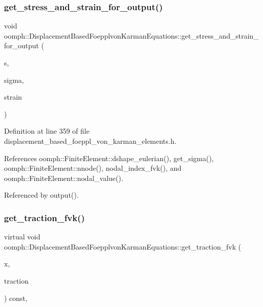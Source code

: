 \subsubsection{\texorpdfstring{get\+\_\+stress\+\_\+and\+\_\+strain\+\_\+for\+\_\+output()}{get\_stress\_and\_strain\_for\_output()}}
{\footnotesize\ttfamily void oomph\+::\+Displacement\+Based\+Foepplvon\+Karman\+Equations\+::get\+\_\+stress\+\_\+and\+\_\+strain\+\_\+for\+\_\+output (\begin{DoxyParamCaption}\item[{const \hyperlink{classoomph_1_1Vector}{Vector}$<$ double $>$ \&}]{s,  }\item[{\hyperlink{classoomph_1_1DenseMatrix}{Dense\+Matrix}$<$ double $>$ \&}]{sigma,  }\item[{\hyperlink{classoomph_1_1DenseMatrix}{Dense\+Matrix}$<$ double $>$ \&}]{strain }\end{DoxyParamCaption})\hspace{0.3cm}{\ttfamily [inline]}}



Definition at line 359 of file displacement\+\_\+based\+\_\+foeppl\+\_\+von\+\_\+karman\+\_\+elements.\+h.



References oomph\+::\+Finite\+Element\+::dshape\+\_\+eulerian(), get\+\_\+sigma(), oomph\+::\+Finite\+Element\+::nnode(), nodal\+\_\+index\+\_\+fvk(), and oomph\+::\+Finite\+Element\+::nodal\+\_\+value().



Referenced by output().

\mbox{\label{classoomph_1_1DisplacementBasedFoepplvonKarmanEquations_afd044e54b959f0238ec8724ea529fbd6}} 
\subsubsection{\texorpdfstring{get\+\_\+traction\+\_\+fvk()}{get\_traction\_fvk()}}
{\footnotesize\ttfamily virtual void oomph\+::\+Displacement\+Based\+Foepplvon\+Karman\+Equations\+::get\+\_\+traction\+\_\+fvk (\begin{DoxyParamCaption}\item[{\hyperlink{classoomph_1_1Vector}{Vector}$<$ double $>$ \&}]{x,  }\item[{\hyperlink{classoomph_1_1Vector}{Vector}$<$ double $>$ \&}]{traction }\end{DoxyParamCaption}) const\hspace{0.3cm}{\ttfamily [inline]}, {\ttfamily [virtual]}}



